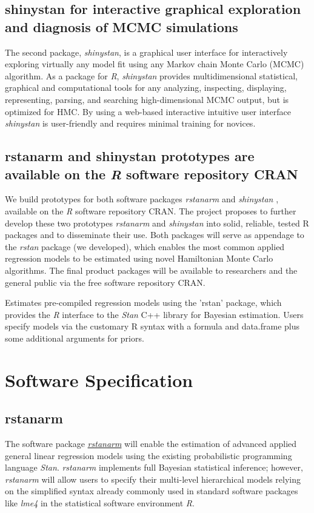 \documentclass[11pt,notitlepage]{article}
\begin{document}
\subsection*{shinystan for interactive graphical exploration and diagnosis of MCMC simulations}  
The second package, \textit{shinystan}, is a graphical user interface for interactively exploring virtually any model fit using any Markov chain Monte Carlo (MCMC) algorithm. As a package for \textit{R}, \textit{shinystan}  provides multidimensional statistical, graphical and computational tools for any analyzing, inspecting, displaying, representing, parsing, and searching high-dimensional MCMC output, but is optimized for HMC. By using a web-based interactive intuitive user interface \textit{shinystan} is user-friendly and requires minimal training for novices.

\subsection*{rstanarm and shinystan prototypes are available on the \textit{R} software repository CRAN}
We build prototypes for both software packages \textit{rstanarm} \cite{rstanarm} and \textit{shinystan} \cite{shinystan, Team2015}, available on the \textit{R} software repository CRAN. The project proposes to further develop these two prototypes \textit{rstanarm} and \textit{shinystan} into solid, reliable, tested R packages and to disseminate their use. Both packages will serve as appendage to the \textit{rstan} package (we developed), which enables the most common applied regression models to be estimated using novel Hamiltonian Monte Carlo algorithms. The final product packages will be available to researchers and the general public via the free software repository CRAN. 

Estimates pre-compiled regression models using the 'rstan' package, which provides
the \textit{R} interface to the \textit{Stan} C++ library for Bayesian estimation. Users specify models via the customary R syntax with a formula and data.frame plus some additional arguments for priors.

\section*{Software Specification}

\subsection*{rstanarm}
The software package \href{https://github.com/stan-dev/rstanarm}{\textit{rstanarm}}
will enable the estimation of advanced applied general linear regression models using 
the existing probabilistic programming language \textit{Stan}. 
\textit{rstanarm} implements full Bayesian statistical inference;  
however, \textit{rstanarm} will allow users to specify their multi-level 
hierarchical models relying on the simplified syntax already commonly 
used in standard software packages like \textit{lme4} in the statistical 
software environment \textit{R}. 
\end{document}
